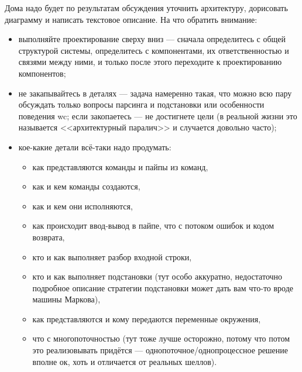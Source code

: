 \documentclass[a5paper]{article}
\begin{document}
Дома надо будет по результатам обсуждения уточнить архитектуру, дорисовать диаграмму и написать текстовое описание. На что обратить внимание:

\begin{itemize}
    \item выполняйте проектирование сверху вниз --- сначала определитесь с общей структурой системы, определитесь с компонентами, их ответственностью и связями между ними, и только после этого переходите к проектированию компонентов;
    \item не закапывайтесь в деталях --- задача намеренно такая, что можно всю пару обсуждать только вопросы парсинга и подстановки или особенности поведения wc; если закопаетесь --- не достигнете цели (в реальной жизни это называется <<архитектурный паралич>> и случается довольно часто);
    \item кое-какие детали всё-таки надо продумать:
    \begin{itemize}
        \item как представляются команды и пайпы из команд,
        \item как и кем команды создаются,
        \item как и кем они исполняются,
        \item как происходит ввод-вывод в пайпе, что с потоком ошибок и кодом возврата,
        \item кто и как выполняет разбор входной строки,
        \item кто и как выполняет подстановки (тут особо аккуратно, недостаточно подробное описание стратегии подстановки может дать вам что-то вроде машины Маркова),
        \item как представляются и кому передаются переменные окружения,
        \item что с многопоточностью (тут тоже лучше осторожно, потому что потом это реализовывать придётся --- однопоточное/однопроцессное решение вполне ок, хоть и отличается от реальных шеллов).
    \end{itemize}
\end{itemize}
\end{document}
